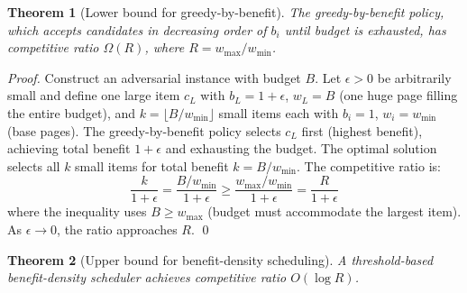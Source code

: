 \documentclass{article}
\newtheorem{theorem}{Theorem}
\newcommand{\bw}{B}
\newcommand{\benefit}{b}
\newcommand{\cost}{w}
\begin{document}
\begin{theorem}[Lower bound for greedy-by-benefit]
\label{thm:greedy-lower}
The greedy-by-benefit policy, which accepts candidates in decreasing order of $\benefit_i$ until budget is exhausted, has competitive ratio $\Omega(R)$, where $R = \cost_{\max}/\cost_{\min}$.
\end{theorem}

\begin{proof}
Construct an adversarial instance with budget $\bw$. Let $\epsilon > 0$ be arbitrarily small and define one large item $c_L$ with $\benefit_L = 1 + \epsilon$, $\cost_L = \bw$ (one huge page filling the entire budget), and $k = \lfloor \bw / \cost_{\min} \rfloor$ small items each with $\benefit_i = 1$, $\cost_i = \cost_{\min}$ (base pages). The greedy-by-benefit policy selects $c_L$ first (highest benefit), achieving total benefit $1 + \epsilon$ and exhausting the budget. The optimal solution selects all $k$ small items for total benefit $k = \bw / \cost_{\min}$. The competitive ratio is:
\[
\frac{k}{1 + \epsilon} = \frac{\bw / \cost_{\min}}{1 + \epsilon} \geq \frac{\cost_{\max} / \cost_{\min}}{1 + \epsilon} = \frac{R}{1 + \epsilon}
\]
where the inequality uses $\bw \geq \cost_{\max}$ (budget must accommodate the largest item). As $\epsilon \to 0$, the ratio approaches $R$. \qed
\end{proof}

\begin{theorem}[Upper bound for benefit-density scheduling]
\label{thm:bks-upper}
A threshold-based benefit-density scheduler achieves competitive ratio $O(\log R)$.
\end{theorem}
\end{document}
